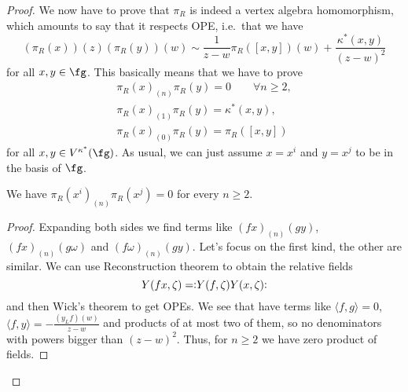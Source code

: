 \documentclass[a4paper, 10pt]{article}
\newcommand\norder[1]{\vcentcolon\mathrel{#1}\vcentcolon}
\begin{document}
\begin{proof}
                We now have to prove that $\pi_R$ is indeed a vertex algebra homomorphism, which amounts to say that it respects OPE, i.e.\ that we have \[(\pi_R(x))(z)(\pi_R(y))(w) \sim \frac{1}{z-w}\pi_R([x, y])(w) + \frac{\kappa^*(x, y)}{(z-w)^2} \] for all $x, y \in \fg$. This basically means that we have to prove 
                \begin{gather*}
                    \pi_R(x)_{(n)}\pi_R(y) = 0 \qquad \forall n \geq 2,\\
                    \pi_R(x)_{(1)}\pi_R(y) = \kappa^*(x, y),\\
                    \pi_R(x)_{(0)}\pi_R(y) = \pi_R([x, y])
                \end{gather*}
                for all $x, y \in V^{\kappa^*}(\fg)$. As usual, we can just assume $x = x^i$ and $y = x^j$ to be in the basis of $\fg$. 
                \begin{prop}
                    We have $\pi_R(x^i)_{(n)}\pi_R(x^j) = 0$ for every $n \geq 2$.
                \end{prop}
                \begin{proof}
                    Expanding both sides we find terms like $(fx)_{(n)}(gy)$, $(fx)_{(n)}(g\omega)$ and $(f\omega)_{(n)}(gy)$. Let's focus on the first kind, the other are similar. We can use Reconstruction theorem to obtain the relative fields \[Y(fx, \zeta) = \norder{Y(f, \zeta)Y(x, \zeta)} \] and then Wick's theorem to get OPEs. We see that have terms like $\langle f, g\rangle = 0$, $\langle f, y \rangle = -\frac{(y_Lf)(w)}{z-w}$ and products of at most two of them, so no denominators with powers bigger than $(z-w)^2$. Thus, for $n \geq 2$ we have zero product of fields.
                \end{proof}
                

\end{proof}
\end{document}
